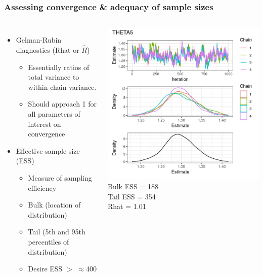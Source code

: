 \documentclass[handout]{beamer}
\begin{document}
\begin{frame}
  \frametitle{Assessing convergence \& adequacy of sample sizes}

\begin{columns}
  \begin{itemize}
    \item Gelman-Rubin diagnostics (Rhat or $\hat{R}$)
          \begin{itemize}
            \item Essentially ratios of total variance to within chain variance.
            \item Should approach 1 for all parameters of interest on convergence
          \end{itemize}
    \item Effective sample size (ESS)
          \begin{itemize}
            \item Measure of sampling efficiency
            \item Bulk (location of distribution)
            \item Tail (5th and 95th percentiles of distribution)
            \item Desire ESS $>$ $\approx$400
          \end{itemize}
  \end{itemize}
  \center
  \vspace{-16pt}
  \includegraphics[width=\textwidth]{graphics/poor-ess.pdf}\\
  Bulk ESS = 188\\
  Tail ESS = 354\\
  Rhat = 1.01
\end{columns}

\end{frame}
\end{document}
